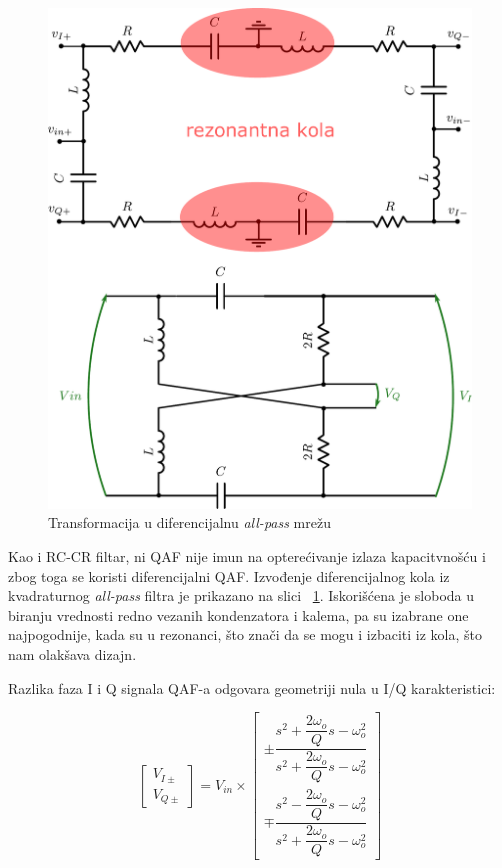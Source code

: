 \documentclass[journal,twocolumn,letterpaper]{IEEEJERM}
\begin{document}
\begin{figure}[!htbp]
  \centering
  \includegraphics[width=\linewidth]{qaf_diff.pdf}
  \caption{Transformacija u diferencijalnu \textit{all-pass} mrežu}
  \label{fig:qaf_diff}
\end{figure}

Kao i RC-CR filtar, ni QAF nije imun na opterećivanje izlaza kapacitvnošću i zbog toga se koristi diferencijalni QAF. Izvođenje diferencijalnog kola iz kvadraturnog \textit{all-pass} filtra je prikazano na slici ~\ref{fig:qaf_diff}. Iskorišćena je sloboda u biranju vrednosti redno vezanih kondenzatora i kalema, pa su izabrane one najpogodnije, kada su u rezonanci, što znači da se mogu i izbaciti iz kola, što nam olakšava dizajn.

Razlika faza I i Q signala QAF-a odgovara geometriji nula u I/Q karakteristici:


\[
\begin{bmatrix}
    V_{I\pm}      \\
    V_{Q\pm}    
\end{bmatrix}   
=
V_{in} \times
\begin{bmatrix}
    \pm \dfrac{s^2 + \dfrac{2 \omega_{o}}{Q} s - \omega_{o}^2}{s^2 + \dfrac{2\omega_{o}}{Q} s - \omega_{o}^2} \\
    \mp \dfrac{s^2 - \dfrac{2 \omega_{o}}{Q} s - \omega_{o}^2}{s^2 + \dfrac{2\omega_{o}}{Q} s - \omega_{o}^2}
\end{bmatrix}
\]
\end{document}
